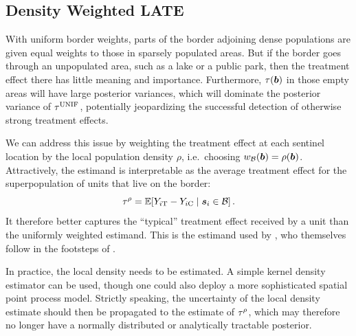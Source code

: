\documentclass[12pt]{article}
\begin{document}
\subsection{Density Weighted LATE}
\label{sec:tau_rho}

With uniform border weights, parts of the border adjoining dense populations are given equal weights to those in sparsely populated areas.
But if the border goes through an unpopulated area, such as a lake or a public park, then the treatment effect there has little meaning and importance.
Furthermore, \(\tau(\bm{b})\) in those empty areas will have large posterior variances, which will dominate the posterior variance of \(\tau^{\mathrm{UNIF}}\), potentially jeopardizing the successful detection of otherwise strong treatment effects.

We can address this issue by weighting the treatment effect at each sentinel location by the local population density $\rho$,
i.e.\ choosing \(w_{\mathcal{B}}(\bm{b}) = \rho(\bm{b})\).
Attractively, the estimand is interpretable as the average treatment effect for the superpopulation of units that live on the border:
\begin{equation}
    \taurho = \E\sbr{Y_{i\treat} - Y_{i\ctrol} \mid \svec_i \in \border}\,.
\end{equation}
It therefore better captures the ``typical'' treatment effect received by a unit than the uniformly weighted estimand.
This is the estimand used by \cite{keele_titiunik_2015}, who themselves follow in the footsteps of \cite{imbens2011regression}.

In practice, the local density needs to be estimated.
A simple kernel density estimator can be used,
though one could also deploy a more sophisticated spatial point process model.
Strictly speaking, the uncertainty of the local density estimate should then be propagated to the estimate of \(\tau^{\rho}\), which may therefore no longer have a normally distributed or analytically tractable posterior.
\end{document}
